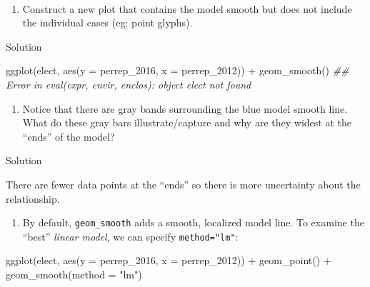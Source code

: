 \documentclass[
  letterpaper,
  DIV=11,
  numbers=noendperiod]{scrreprt}
\newenvironment{Shaded}{\begin{snugshade}}{\end{snugshade}}
\newcommand{\AttributeTok}[1]{\textcolor[rgb]{0.40,0.45,0.13}{#1}}
\newcommand{\DocumentationTok}[1]{\textcolor[rgb]{0.37,0.37,0.37}{\textit{#1}}}
\newcommand{\FunctionTok}[1]{\textcolor[rgb]{0.28,0.35,0.67}{#1}}
\newcommand{\NormalTok}[1]{\textcolor[rgb]{0.00,0.23,0.31}{#1}}
\newcommand{\SpecialCharTok}[1]{\textcolor[rgb]{0.37,0.37,0.37}{#1}}
\newcommand{\StringTok}[1]{\textcolor[rgb]{0.13,0.47,0.30}{#1}}
\providecommand{\tightlist}{%
  \setlength{\itemsep}{0pt}\setlength{\parskip}{0pt}}\usepackage{longtable,booktabs,array}
\begin{document}
~

\begin{enumerate}
\def\labelenumi{\alph{enumi}.}
\setcounter{enumi}{1}
\tightlist
\item
  Construct a new plot that contains the model smooth but does not
  include the individual cases (eg: point glyphs).
\end{enumerate}

Solution

\begin{Shaded}
\begin{Highlighting}[]
\FunctionTok{ggplot}\NormalTok{(elect, }\FunctionTok{aes}\NormalTok{(}\AttributeTok{y =}\NormalTok{ perrep\_2016, }\AttributeTok{x =}\NormalTok{ perrep\_2012)) }\SpecialCharTok{+}
  \FunctionTok{geom\_smooth}\NormalTok{()}
\DocumentationTok{\#\# Error in eval(expr, envir, enclos): object \textquotesingle{}elect\textquotesingle{} not found}
\end{Highlighting}
\end{Shaded}

\hfill\break

\begin{enumerate}
\def\labelenumi{\alph{enumi}.}
\setcounter{enumi}{2}
\tightlist
\item
  Notice that there are gray bands surrounding the blue model smooth
  line. What do these gray bars illustrate/capture and why are they
  widest at the ``ends'' of the model?
\end{enumerate}

Solution

There are fewer data points at the ``ends'' so there is more uncertainty
about the relationship.

\begin{enumerate}
\def\labelenumi{\alph{enumi}.}
\setcounter{enumi}{3}
\tightlist
\item
  By default, \texttt{geom\_smooth} adds a smooth, localized model line.
  To examine the ``best'' \emph{linear model}, we can specify
  \texttt{method="lm"}:
\end{enumerate}

\begin{Shaded}
\begin{Highlighting}[]
\FunctionTok{ggplot}\NormalTok{(elect, }\FunctionTok{aes}\NormalTok{(}\AttributeTok{y =}\NormalTok{ perrep\_2016, }\AttributeTok{x =}\NormalTok{ perrep\_2012)) }\SpecialCharTok{+}
  \FunctionTok{geom\_point}\NormalTok{() }\SpecialCharTok{+}
  \FunctionTok{geom\_smooth}\NormalTok{(}\AttributeTok{method =} \StringTok{"lm"}\NormalTok{)}
\end{Highlighting}
\end{Shaded}
\end{document}
